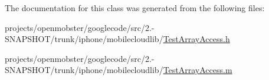 \-The documentation for this class was generated from the following files\-:\begin{DoxyCompactItemize}
\item 
projects/openmobster/googlecode/src/2.-\/\-S\-N\-A\-P\-S\-H\-O\-T/trunk/iphone/mobilecloudlib/\hyperlink{_test_array_access_8h}{\-Test\-Array\-Access.\-h}\item 
projects/openmobster/googlecode/src/2.-\/\-S\-N\-A\-P\-S\-H\-O\-T/trunk/iphone/mobilecloudlib/\hyperlink{_test_array_access_8m}{\-Test\-Array\-Access.\-m}\end{DoxyCompactItemize}
